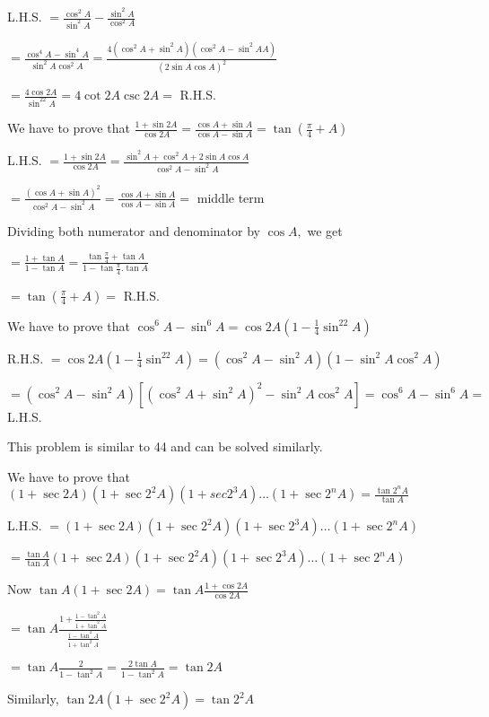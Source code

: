   L.H.S. $= \frac{\cos^2A}{\sin^2A} - \frac{\sin^2A}{\cos^2A}$

  $= \frac{\cos^4A - \sin^4A}{\sin^2A\cos^2A} = \frac{4(\cos^2A + \sin^2A)(\cos^2A - \sin^2AA)}{(2\sin A\cos A)^2}$

  $= \frac{4\cos 2A}{\sin^22A} = 4\cot 2A\csc 2A =$ R.H.S.

\item We have to prove that $\frac{1 +\sin 2A}{\cos2A} = \frac{\cos A + \sin A}{\cos A - \sin A} = \tan\left(\frac{\pi}{4} +
  A\right)$

  L.H.S. $= \frac{1 +\sin 2A}{\cos2A} = \frac{\sin^2A + \cos^2A + 2\sin A\cos A}{\cos^2A - \sin^2A}$

  $= \frac{(\cos A + \sin A)^2}{\cos^2A - \sin^2A} = \frac{\cos A + \sin A}{\cos A - \sin A} =$ middle term

  Dividing both numerator and denominator by $\cos A,$ we get

  $= \frac{1 + \tan A}{1 - \tan A} = \frac{\tan\frac{\pi}{4} + \tan A}{1 - \tan\frac{\pi}{4}.\tan A}$

  $= \tan\left(\frac{\pi}{4} + A\right) =$ R.H.S.

\item We have to prove that $\cos^6A - \sin^6A = \cos2A\left(1 - \frac{1}{4}\sin^22A\right)$

  R.H.S. $= \cos2A\left(1 - \frac{1}{4}\sin^22A\right) = (\cos^2A - \sin^2A)(1 - \sin^2A\cos^2A)$

  $= (\cos^2A - \sin^2A)[(\cos^2A + \sin^2A)^2 - \sin^2A\cos^2A] = \cos^6A - \sin^6A =$ L.H.S.

\item This problem is similar to 44 and can be solved similarly.

\item We have to prove that $(1 + \sec2A)(1+ \sec2^2A)(1 + sec2^3A) \ldots (1 + \sec2^nA) = \frac{\tan2^nA}{\tan A}$

  L.H.S. $= (1 + \sec2A)(1 + \sec2^2A)(1 + \sec2^3A) \ldots (1 + \sec2^nA)$

  $= \frac{\tan A}{\tan A}(1 + \sec2A)(1 + \sec2^2A)(1 + \sec2^3A) \ldots (1 + \sec2^nA)$

  Now $\tan A(1 + \sec 2A) = \tan A\frac{1 + \cos 2A}{\cos 2A}$

  $= \tan A\frac{1 + \frac{1 - \tan^2A}{1 + \tan^2A}}{\frac{1 - \tan^2A}{1 + \tan^2A}}$

  $= \tan A\frac{2}{1 - \tan^2A} = \frac{2\tan A}{1 - \tan^2A} = \tan 2A$

  Similarly, $\tan 2A(1 + \sec2^2A) = \tan2^2A$


